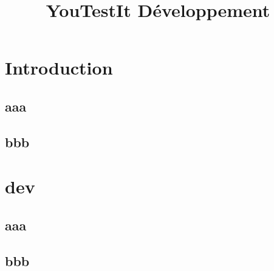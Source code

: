 \documentclass[10pt]{smile}
\title{YouTestIt Développement}
\begin{document}
\makefront


\chapter{Introduction}

\section{aaa}

\section{bbb}



\chapter{dev}

\section{aaa}

\section{bbb}
\end{document}

